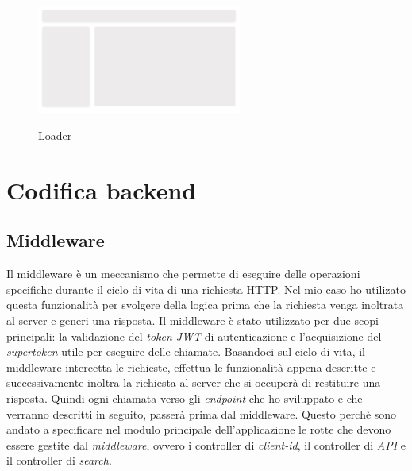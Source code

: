 \begin{figure}[ht]
  \centering
  \includegraphics[width=0.6\textwidth, alt={Skeleton loader di caricamento principale dell'applicazione}]{images/frontend/Loader.jpg}
  \caption{Loader}\label{fig:loader}
\end{figure}
\pagebreak

\section{Codifica backend}\label{sec:codifica-backend}

\subsection{Middleware}\label{subsec:middleware}
Il middleware è un meccanismo che permette di eseguire delle operazioni specifiche durante il ciclo di vita di una richiesta HTTP. 
Nel mio caso ho utilizato questa funzionalità per svolgere della logica prima che la richiesta venga inoltrata al server e generi una risposta.
Il middleware è stato utilizzato per due scopi principali: la validazione del \textit{token JWT} di autenticazione e l'acquisizione del \textit{supertoken} utile per eseguire delle chiamate.
Basandoci sul ciclo di vita, il middleware intercetta le richieste, effettua le funzionalità appena descritte e successivamente inoltra la richiesta al server che si occuperà di restituire una risposta.
Quindi ogni chiamata verso gli \textit{endpoint} che ho sviluppato e che verranno descritti in seguito, passerà prima dal middleware. Questo perchè sono andato a specificare
nel modulo principale dell'applicazione le rotte che devono essere gestite dal \textit{middleware}, ovvero i controller di \textit{client-id}, il controller di \textit{API} e il controller di \textit{search}.

